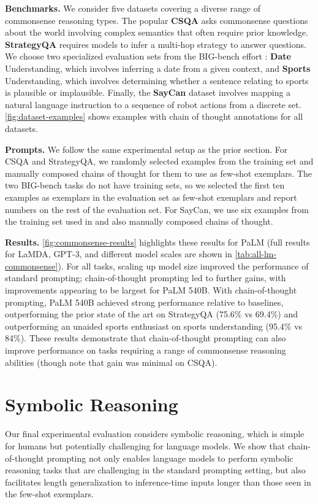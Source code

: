 \textbf{Benchmarks.}
We consider five datasets covering a diverse range of commonsense reasoning types. The popular \textbf{CSQA} \citep{talmor-etal-2019-commonsenseqa} asks commonsense questions about the world involving complex semantics that often require prior knowledge.
\textbf{StrategyQA} \citep{geva-etal-2021-aristotle} requires models to infer a multi-hop strategy to answer questions. We choose two specialized evaluation sets from the BIG-bench effort \citep{bigbench}: \textbf{Date} Understanding, which involves inferring a date from a given context, and \textbf{Sports} Understanding, which involves determining whether a sentence relating to sports is plausible or implausible. Finally, the \textbf{SayCan} dataset \citep{ahn2022can} involves mapping a natural language instruction to a sequence of robot actions from a discrete set.
\cref{fig:dataset-examples} shows examples with chain of thought annotations for all datasets.

\textbf{Prompts.}
We follow the same experimental setup as the prior section. For CSQA and StrategyQA, we randomly selected examples from the training set and manually composed chains of thought for them to use as few-shot exemplars. The two BIG-bench tasks do not have training sets, so we selected the first ten examples as exemplars in the evaluation set as few-shot exemplars and report numbers on the rest of the evaluation set. For SayCan, we use six examples from the training set used in \citet{ahn2022can} and also manually composed chains of thought.

\textbf{Results.}
\cref{fig:commonsense-results} highlights these results for PaLM (full results for LaMDA, GPT-3, and different model scales are shown in \cref{tab:all-lm-commonsense}).
For all tasks, scaling up model size improved the performance of standard prompting; chain-of-thought prompting led to further gains, with improvements appearing to be largest for PaLM 540B. With chain-of-thought prompting, PaLM 540B achieved strong performance relative to baselines, outperforming the prior state of the art on StrategyQA (75.6\% vs 69.4\%) and outperforming an unaided sports enthusiast on sports understanding (95.4\% vs 84\%).
These results demonstrate that chain-of-thought prompting can also improve performance on tasks requiring a range of commonsense reasoning abilities (though note that gain was minimal on CSQA).




\section{Symbolic Reasoning}\label{sec:symbolic-reasoning}
Our final experimental evaluation considers symbolic reasoning, which is simple for humans but potentially challenging for language models. We show that chain-of-thought prompting not only enables language models to perform symbolic reasoning tasks that are challenging in the standard prompting setting, but also facilitates length generalization to inference-time inputs longer than those seen in the few-shot exemplars.

